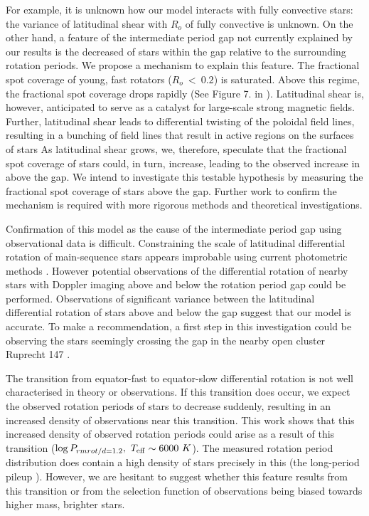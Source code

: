 For example, it is unknown how our model interacts with fully convective stars: the variance of latitudinal shear with $R_o$ of fully convective is unknown.
On the other hand, a feature of the intermediate period gap not currently explained by our results is the decreased \rper{} of stars within the gap relative to the surrounding rotation periods.
We propose a mechanism to explain this feature.
The fractional spot coverage of young, fast rotators ($R_o \ < \ 0.2$) is saturated.
Above this regime, the fractional spot coverage drops rapidly (See Figure 7. in \citet{cao_starspots_2022}).
Latitudinal shear is, however, anticipated to serve as a catalyst for large-scale strong magnetic fields.
Further, latitudinal shear leads to differential twisting of the poloidal field lines, resulting in a bunching of field lines that result in active regions on the surfaces of stars \citep[see, e.g.,][]{berdyugina_starspots_2005, miesch_large-scale_2005, magnetism_brun_2017}
As latitudinal shear grows, we, therefore, speculate that the fractional spot coverage of stars could, in turn, increase, leading to the observed increase in \rper{} above the gap.
We intend to investigate this testable hypothesis by measuring the fractional spot coverage of stars above the gap.
Further work to confirm the mechanism is required with more rigorous methods and theoretical investigations.

Confirmation of this model as the cause of the intermediate period gap using observational data is difficult.
Constraining the scale of latitudinal differential rotation of main-sequence stars appears improbable using current photometric methods \citep[See Section 4.3 of][]{aigrain_hare_2015}.
However potential observations of the differential rotation of nearby stars with Doppler imaging above and below the rotation period gap could be performed.
Observations of significant variance between the latitudinal differential rotation of stars above and below the gap suggest that our model is accurate.
To make a recommendation, a first step in this investigation could be observing the stars seemingly crossing the gap in the nearby open cluster Ruprecht 147 \citep{curtis_when_2020}.

The transition from equator-fast to equator-slow differential rotation is not well characterised in theory or observations.
If this transition does occur, we expect the observed rotation periods of stars to decrease suddenly, resulting in an increased density of observations near this transition.
This work shows that this increased density of observed rotation periods could arise as a result of this transition ($\log P_{rm{rot}/d = 1.2}, \ T_{\rm{eff}} \sim 6000 \ K$).
The measured \kepler{} rotation period distribution does contain a high density of stars precisely in this (the long-period pileup \citep{van_saders_forward_2019} ). However, we are hesitant to suggest whether this feature results from this transition or from the selection function of \kepler{} observations being biased towards higher mass, brighter stars.

